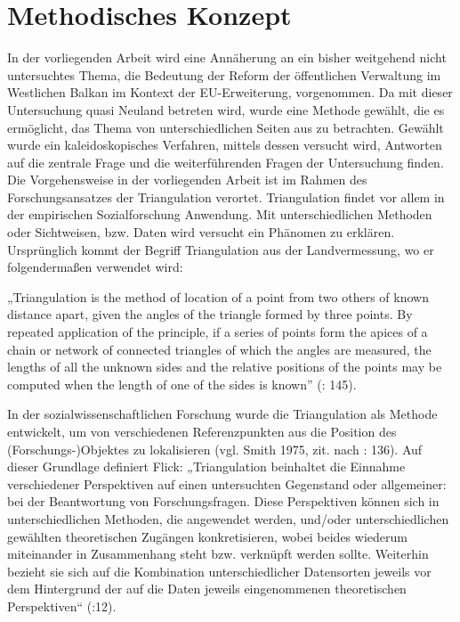 \section{Methodisches Konzept}
In der vorliegenden Arbeit wird eine Annäherung an ein bisher weitgehend nicht untersuchtes Thema, die Bedeutung der Reform der öffentlichen Verwaltung im Westlichen Balkan im Kontext der EU-Erweiterung, vorgenommen. Da mit dieser Untersuchung quasi Neuland betreten wird, wurde eine Methode gewählt, die es ermöglicht, das Thema von unterschiedlichen Seiten aus zu betrachten. Gewählt wurde ein kaleidoskopisches Verfahren, mittels dessen versucht wird, Antworten auf die zentrale Frage und die weiterführenden Fragen der Untersuchung finden. Die Vorgehensweise in der vorliegenden Arbeit ist im Rahmen des Forschungsansatzes der Triangulation verortet. Triangulation findet vor allem in der empirischen Sozialforschung Anwendung. Mit unterschiedlichen Methoden oder Sichtweisen, bzw. Daten wird versucht ein Phänomen zu erklären. Ursprünglich kommt der Begriff Triangulation aus der Landvermessung, wo er folgendermaßen verwendet wird:\par
„Triangulation is the method of location of a point from two others of known distance apart, given the angles of the triangle formed by three points. By repeated application of the principle, if a series of points form the apices of a chain or network of connected triangles of which the angles are measured, the lengths of all the unknown sides and the relative positions of the points may be computed when the length of one of the sides is known” (\cite{clark}: 145).\par
In der sozialwissenschaftlichen Forschung wurde die Triangulation als Methode entwickelt, um von verschiedenen Referenzpunkten aus die Position des (Forschungs-)Objektes zu lokalisieren (vgl. Smith 1975, zit. nach \cite{jick}: 136). Auf dieser Grundlage definiert Flick: „Triangulation beinhaltet die Einnahme verschiedener Perspektiven auf einen untersuchten Gegenstand oder allgemeiner: bei der Beantwortung von Forschungsfragen. Diese Perspektiven können sich in unterschiedlichen Methoden, die angewendet werden, und/oder unterschiedlichen gewählten theoretischen Zugängen konkretisieren, wobei beides wiederum miteinander in Zusammenhang steht bzw. verknüpft werden sollte. Weiterhin bezieht sie sich auf die Kombination unterschiedlicher Datensorten jeweils vor dem Hintergrund der auf die Daten jeweils eingenommenen theoretischen Perspektiven“ (\cite{flick08}:12).\par

